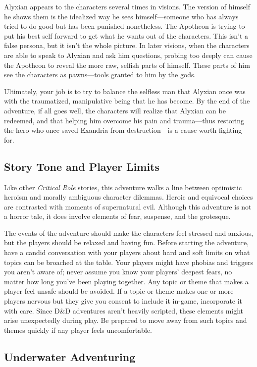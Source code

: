 \documentclass[letterpaper, 11pt, bg=full, twocolumn]{dndbook}
\begin{document}
Alyxian appears to the characters several times in visions. The version of himself he shows them is the idealized way he sees himself---someone who has always tried to do good but has been punished nonetheless. The Apotheon is trying to put his best self forward to get what he wants out of the characters. This isn't a false persona, but it isn't the whole picture. In later visions, when the characters are able to speak to Alyxian and ask him questions, probing too deeply can cause the Apotheon to reveal the more raw, selfish parts of himself. These parts of him see the characters as pawns---tools granted to him by the gods.

Ultimately, your job is to try to balance the selfless man that Alyxian once was with the traumatized, manipulative being that he has become. By the end of the adventure, if all goes well, the characters will realize that Alyxian can be redeemed, and that helping him overcome his pain and trauma---thus restoring the hero who once saved Exandria from destruction---is a cause worth fighting for.
\subsection{Story Tone and Player Limits}

Like other \textit{Critical Role} stories, this adventure walks a line between optimistic heroism and morally ambiguous character dilemmas. Heroic and equivocal choices are contrasted with moments of supernatural evil. Although this adventure is not a horror tale, it does involve elements of fear, suspense, and the grotesque.

The events of the adventure should make the characters feel stressed and anxious, but the players should be relaxed and having fun. Before starting the adventure, have a candid conversation with your players about hard and soft limits on what topics can be broached at the table. Your players might have phobias and triggers you aren't aware of; never assume you know your players' deepest fears, no matter how long you've been playing together. Any topic or theme that makes a player feel unsafe should be avoided. If a topic or theme makes one or more players nervous but they give you consent to include it in-game, incorporate it with care. Since D\&D adventures aren't heavily scripted, these elements might arise unexpectedly during play. Be prepared to move away from such topics and themes quickly if any player feels uncomfortable.
\subsection{Underwater Adventuring}
\end{document}
